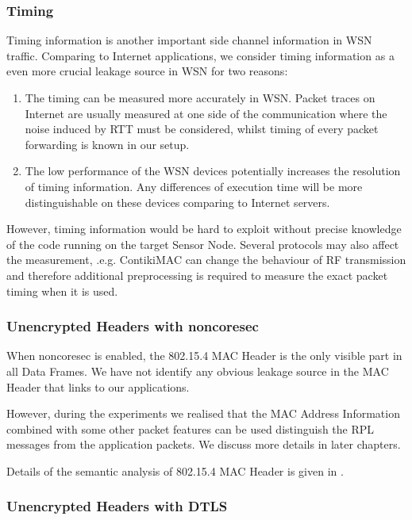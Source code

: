 \subsubsection{Timing}

Timing information is another important side channel information in WSN traffic. Comparing to Internet applications, we consider timing information as a even more crucial leakage source in WSN for two reasons:

\begin{enumerate}
	\item The timing can be measured more accurately in WSN. Packet traces on Internet are usually measured at one side of the communication where the noise induced by RTT must be considered, whilst timing of every packet forwarding is known in our setup.
	\item The low performance of the WSN devices potentially increases the resolution of timing information. Any differences of execution time will be more distinguishable on these devices comparing to Internet servers.
\end{enumerate}

However, timing information would be hard to exploit without precise knowledge of the code running on the target Sensor Node. Several protocols may also affect the measurement, .e.g. ContikiMAC can change the behaviour of RF transmission and therefore additional preprocessing is required to measure the exact packet timing when it is used.

\subsubsection{Unencrypted Headers with noncoresec}

When noncoresec is enabled, the 802.15.4 MAC Header is the only visible part in all Data Frames. We have not identify any obvious leakage source in the MAC Header that links to our applications. 

However, during the experiments we realised that the MAC Address Information combined with some other packet features can be used distinguish the RPL messages from the application packets. We discuss more details in later chapters.

Details of the semantic analysis of 802.15.4 MAC Header is given in . 

\subsubsection{Unencrypted Headers with DTLS}

